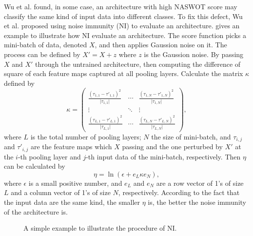 \documentclass[sigconf]{acmart}
\begin{document}
    Wu et al. \cite{10092788} found, in some case, an architecture with high 
    NASWOT score may classify the same kind of input data into different classes. 
    To fix this defect, Wu et al. proposed using noise immunity (NI) to 
    evaluate an architecture.  gives an example to illustrate how 
    NI evaluate an architecture. The score function picks a 
    mini-batch of data, denoted $X$, and then applies Gaussion noise on it. 
    The process can be defined by $X'=X+z$ where $z$ is the Gaussion noise. 
    By passing $X$ and $X'$ through the untrained architecture, then computing 
    the difference of square of each feature maps captured at all pooling layers. 
    Calculate the matrix $\kappa$ defined by 
    \begin{equation}
        \label{equ:ni_kappa}
        \kappa=\begin{pmatrix}\frac{(\tau_{1,1}-\tau'_{1,1})^2}{\lvert \tau_{1,1}\rvert}&\cdots&\frac{(\tau_{1,N}-\tau'_{1,N})^2}{\lvert \tau_{1,N}\rvert}\\\vdots&\ddots&\vdots\\\frac{(\tau_{L,1}-\tau'_{L,1})^2}{\lvert \tau_{L,1}\rvert}&\cdots&\frac{(\tau_{L,N}-\tau'_{L,N})^2}{\lvert \tau_{L,N}\rvert}\end{pmatrix},
    \end{equation}
    where $L$ is the total number of pooling layers; $N$ the size of mini-batch, 
    and $\tau_{i,j}$ and $\tau'_{i,j}$ are the feature maps which $X$ passing and 
    the one perturbed by $X'$ at the $i$-th pooling layer and $j$-th input 
    data of the mini-batch, respectively. 
    Then $\eta$ can be calculated by 
    \begin{equation}
        \label{equ:ni_eta}
        \eta=\ln(\epsilon+e_L\kappa e_N),
    \end{equation}
    where $\epsilon$ is a small positive number, and $e_L$ and $e_N$ are a row 
    vector of 1's of size $L$ and a column vector of 1's of size $N$, respectively. 
    According to the fact that the input data are the same kind, the smaller $\eta$ 
    is, the better the noise immunity of the architecture is.

    \begin{figure*}[tb]
        \vspace{-\baselineskip}
        \caption{A simple example to illustrate the procedure of NI.}
        \label{fig:ni}
        \centering
        \vspace{-\baselineskip}
    \end{figure*}
\end{document}
